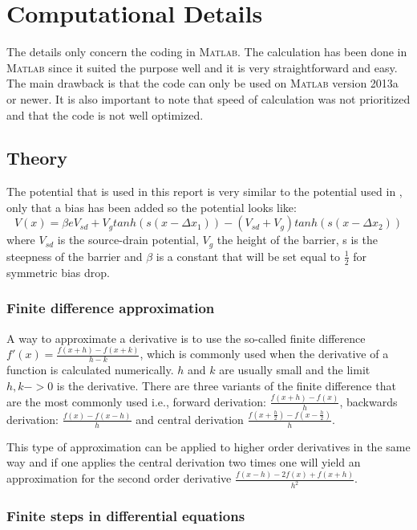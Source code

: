 \documentclass[a4paper]{article}
\begin{document}
\section{Computational Details}
The details only concern the coding in \textsc{Matlab}.
The calculation has been done in \textsc{Matlab} since it suited the purpose well and it is very straightforward and easy.
The main drawback is that the code can only be used on \textsc{Matlab} version 2013a or newer.
It is also important to note that speed of calculation was not prioritized and that the code is not well optimized.

\subsection{Theory}
The potential that is used in this report is very similar to the potential used in \cite{5}, only that a bias has been added so the potential looks like: \begin{equation}
\label{potential}
V(x) = \beta e V_{sd}+V_{g} tanh(s (x-\Delta x_{1}))-(V_{sd}+V_{g}) tanh(s (x-\Delta x_{2}))
\end{equation}
where $V_{sd}$ is the source-drain potential, $V_{g}$ the height of the barrier, s is the steepness of the barrier and $\beta$ is a constant that will be set equal to $\frac{1}{2}$ for symmetric bias drop. 
\subsubsection{Finite difference approximation}
A way to approximate a derivative is to use the so-called finite difference $f'(x) =\frac{f(x+h)-f(x+k)}{h-k}$, which is commonly used when the derivative of a function is calculated numerically. $h$ and $k$ are usually small and the limit $h,k->0$ is the derivative.
There are three variants of the finite difference that are the most commonly used i.e., forward derivation: $\frac{f(x+h)-f(x)}{h}$, backwards derivation: $\frac{f(x)-f(x-h)}{h}$ and central derivation $\frac{f(x+\frac{h}{2})-f(x-\frac{h}{2})}{h}$.

This type of approximation can be applied to higher order derivatives in the same way and if one applies the central derivation two times one will yield an approximation for the second order derivative $\frac{f(x-h)- 2f(x) +f(x+h)}{h^2}$.

\subsubsection{Finite steps in differential equations}
\end{document}
